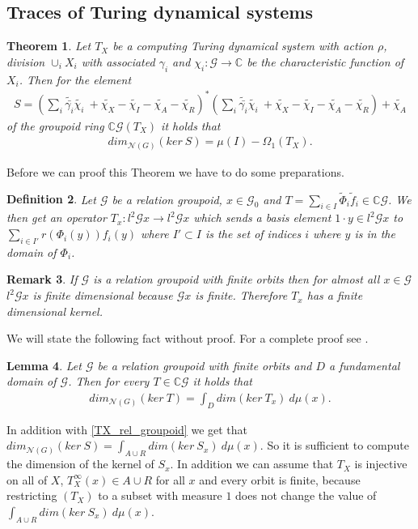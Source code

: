 \documentclass[12pt,a4paper]{scrartcl}
\newtheorem{Theorem}{Theorem}[section]
\newtheorem{Definition}[Theorem]{Definition}
\newtheorem{Lemma}[Theorem]{Lemma}
\newtheorem{Remark}[Theorem]{Remark}
\numberwithin{equation}{section}
\newcommand{\C}{\mathbb{C}} %
\newcommand{\2}{\mathbb{Z} / 2 \mathbb{Z}}
\newcommand{\G}{\mathcal{G}}
\newcommand{\1}{\bar{1}}
\newcommand{\0}{\bar{0}}
\begin{document}
\subsection{Traces of Turing dynamical systems}
\begin{Theorem} \label{groserSatz}
	Let $T_X$ be a computing Turing dynamical system with action $\rho$, division $\cup_i X_i$ with associated $\gamma_i$ and $\chi_i : \G \to \C$ be the characteristic function of $X_i$. Then for the element
	\begin{align*}
		S = (\sum_{i} \tilde{\bar{\gamma_i}} \tilde{\chi_i} \ + \tilde{\chi_X} - \tilde{\chi_I} - \tilde{\chi_A} - \tilde{\chi_R})^*(\sum_{i} \tilde{\bar{\gamma_i}} \tilde{\chi_i} \ + \tilde{\chi_X} - \tilde{\chi_I} - \tilde{\chi_A} - \tilde{\chi_R}) + \tilde{\chi_A}
	\end{align*}
	of the groupoid ring $\C \G(T_X)$ it holds that
	\begin{align*}
		dim_{\mathcal{N}(G)}(ker \ S) = \mu(I) - \Omega_1(T_X).
	\end{align*}
\end{Theorem}
Before we can proof this Theorem we have to do some preparations. 
\begin{Definition}
	Let $\G$ be a relation groupoid, $x \in \G_0$ and $T = \sum_{i \in I} \tilde \Phi_i\tilde f_i \in \C\G$. We then get an operator $T_x: l^2\G x \to l^2\G x$ which sends a basis element $1 \cdot y \in l^2\G x$ to $\sum_{i \in I'} r(\Phi_i(y)) f_i(y)$ where $I' \subset I$ is the set of indices $i$ where $y$ is in the domain of $\Phi_i$. 
\end{Definition}
\begin{Remark}
	If $\G$ is a relation groupoid with finite orbits then for almost all $x \in \G$ $l^2\G x$ is finite dimensional because $\G x$ is finite. Therefore $T_x$ has a finite dimensional kernel.
\end{Remark}
We will state the following fact without proof. For a complete proof see \cite{GRAB}.
\begin{Lemma}
	Let $\G$ be a relation groupoid with finite orbits and $D$ a fundamental domain of $\G$. Then for every $T \in \C \G$ it holds that
	\begin{align*}
		dim_{\mathcal{N}(G)}(ker \ T) = \int_D dim (ker \ T_x) \ d \mu (x).
	\end{align*} 
\end{Lemma}
In addition with \ref{TX_rel_groupoid} we get that $dim_{\mathcal{N}(G)}(ker \ S) = \int_{A \cup R} dim (ker \ S_x) \ d \mu (x)$. So it is sufficient to compute the dimension of the kernel of $S_x$. In addition we can assume that $T_X$ is injective on all of $X$, $T_X^\infty(x) \in A \cup R$ for all $x$ and every orbit is finite, because restricting $(T_X)$ to a subset with measure $1$ does not change the value of $\int_{A \cup R} dim (ker \ S_x) \ d \mu (x)$. 
\end{document}

